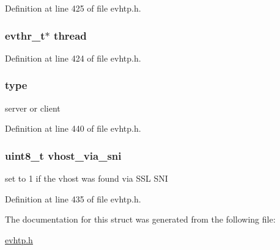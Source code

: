 \-Definition at line 425 of file evhtp.\-h.

\hypertarget{structevhtp__connection__s_aaf924ac18ad3dd26c8676d835116579e}{
\subsubsection[{thread}]{\setlength{\rightskip}{0pt plus 5cm}evthr\-\_\-t$\ast$ {\bf thread}}}\label{structevhtp__connection__s_aaf924ac18ad3dd26c8676d835116579e}


\-Definition at line 424 of file evhtp.\-h.

\hypertarget{structevhtp__connection__s_a6188c3148fbaafe2848b330c9f8f4732}{
\subsubsection[{type}]{ {\bf type}}}\label{structevhtp__connection__s_a6188c3148fbaafe2848b330c9f8f4732}
server or client 

\-Definition at line 440 of file evhtp.\-h.

\hypertarget{structevhtp__connection__s_a7f7e7921437e13781ac277814b976590}{
\subsubsection[{vhost\-\_\-via\-\_\-sni}]{\setlength{\rightskip}{0pt plus 5cm}uint8\-\_\-t {\bf vhost\-\_\-via\-\_\-sni}}}\label{structevhtp__connection__s_a7f7e7921437e13781ac277814b976590}
set to 1 if the vhost was found via \-S\-S\-L \-S\-N\-I 

\-Definition at line 435 of file evhtp.\-h.



\-The documentation for this struct was generated from the following file\-:\begin{DoxyCompactItemize}
\item 
\hyperlink{evhtp_8h}{evhtp.\-h}\end{DoxyCompactItemize}
